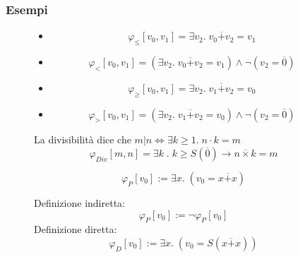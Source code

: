 \documentclass{article}
\theoremstyle{break}
\theoremstyle{break}
\theoremstyle{break}
\theoremstyle{break}
\begin{document}
  \subsubsection{Esempi}
  \begin{figure}[H]
    \begin{example}[Disuguaglianze]
      \begin{itemize}
        \item 
          \[
            \varphi_{\le} [v_0, v_1] = \exists v_2.\; v_0 \overline{+} v_2 = v_1
          \] 
        \item \[
            \varphi_{<} [v_0, v_1] = (\exists v_2.\; v_0 \overline{+}v_2 = v_1) \wedge \neg(v_2 = \overline{0})
          \] 
        \item \[
            \varphi_{\ge } [v_0, v_1] = \exists v_2.\; v_1 \overline{+} v_2 = v_0
          \] 
        \item \[
            \varphi_{>} [v_0, v_1] = (\exists v_2.\; v_1 \overline{+}v_2 = v_0) \wedge \neg(v_2 = \overline{0})
          \] 
      \end{itemize}
    \end{example}
  \end{figure}
  \begin{figure}[H]
    \begin{example}[Divisibilità]
      La divisibilità dice che \( m|n \Leftrightarrow \exists k \ge 1.\; n \cdot k = m \) 
      \[
        \varphi_{Div}[m,n] = \exists k\;.\; k \ge S(\overline{0}) \to n \overline{\times} k = m
      \] 
    \end{example}
  \end{figure}

  \begin{figure}[H]
    \begin{example}
      \[
        \varphi_{P}[v_0] := \exists x.\; (v_0 = x \overline{+} x)
      \] 
    \end{example}
  \end{figure}

  \begin{figure}[H]
    \begin{example}
      Definizione indiretta:
      \[
        \varphi_{P}[v_0] := \neg \varphi_{P}[v_0]
      \] 
      Definizione diretta:
      \[
        \varphi_{D}[v_0] := \exists x.\; (v_0 = S(x \overline{+} x))
      \] 
    \end{example}
  \end{figure}
\end{document}
